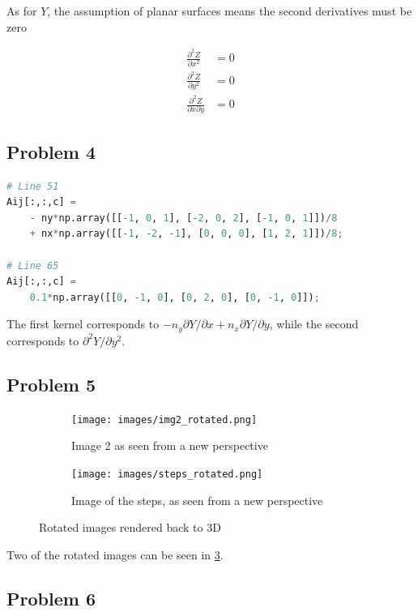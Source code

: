 \documentclass{article}
\begin{document}
As for $Y$, the assumption of planar surfaces means the second derivatives must be zero

\begin{equation}
\begin{split}
	\frac{\partial^2 Z}{\partial x^2} &= 0 \\
	\frac{\partial^2 Z}{\partial y^2} &= 0 \\
	\frac{\partial^2 Z}{\partial x \partial y} &= 0
\end{split}
\end{equation}


\subsection*{Problem 4}
\begin{lstlisting}[language=Python]
# Line 51
Aij[:,:,c] = 
	- ny*np.array([[-1, 0, 1], [-2, 0, 2], [-1, 0, 1]])/8
	+ nx*np.array([[-1, -2, -1], [0, 0, 0], [1, 2, 1]])/8;
	
# Line 65
Aij[:,:,c] = 
	0.1*np.array([[0, -1, 0], [0, 2, 0], [0, -1, 0]]);
\end{lstlisting}

The first kernel corresponds to $-n_y\partial Y / \partial x + n_x\partial Y / \partial y$, while the second corresponds to $\partial^2 Y / \partial y^2$.\\

\subsection*{Problem 5}

\begin{figure}[h!]
	\centering
	\begin{subfigure}{0.4\linewidth}
		\texttt{[image: images/img2\_rotated.png]}
		\caption{Image 2 as seen from a new perspective}
		\label{fig:p51}
	\end{subfigure}
	\begin{subfigure}{0.4\linewidth}
		\texttt{[image: images/steps\_rotated.png]}
		\caption{Image of the steps, as seen from a new perspective}
		\label{fig:p52}
	\end{subfigure}
	\caption{Rotated images rendered back to 3D}
	\label{fig:p5}
\end{figure}

Two of the rotated images can be seen in \cref{fig:p5}.


\subsection*{Problem 6}
\end{document}
